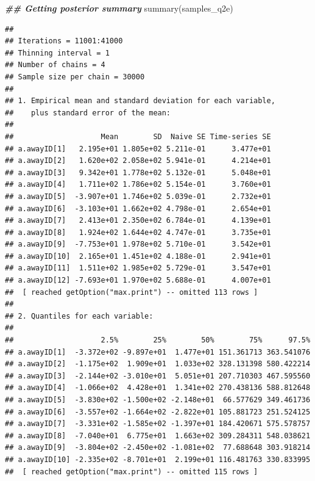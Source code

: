 \documentclass[
]{article}
\newenvironment{Shaded}{\begin{snugshade}}{\end{snugshade}}
\newcommand{\DocumentationTok}[1]{\textcolor[rgb]{0.56,0.35,0.01}{\textbf{\textit{#1}}}}
\newcommand{\FunctionTok}[1]{\textcolor[rgb]{0.00,0.00,0.00}{#1}}
\newcommand{\NormalTok}[1]{#1}
\begin{document}
\begin{Shaded}
\begin{Highlighting}[]
\DocumentationTok{\#\# Getting posterior summary}
\FunctionTok{summary}\NormalTok{(samples\_q2e)}
\end{Highlighting}
\end{Shaded}

\begin{verbatim}
## 
## Iterations = 11001:41000
## Thinning interval = 1 
## Number of chains = 4 
## Sample size per chain = 30000 
## 
## 1. Empirical mean and standard deviation for each variable,
##    plus standard error of the mean:
## 
##                    Mean        SD  Naive SE Time-series SE
## a.awayID[1]   2.195e+01 1.805e+02 5.211e-01      3.477e+01
## a.awayID[2]   1.620e+02 2.058e+02 5.941e-01      4.214e+01
## a.awayID[3]   9.342e+01 1.778e+02 5.132e-01      5.048e+01
## a.awayID[4]   1.711e+02 1.786e+02 5.154e-01      3.760e+01
## a.awayID[5]  -3.907e+01 1.746e+02 5.039e-01      2.732e+01
## a.awayID[6]  -3.103e+01 1.662e+02 4.798e-01      2.654e+01
## a.awayID[7]   2.413e+01 2.350e+02 6.784e-01      4.139e+01
## a.awayID[8]   1.924e+02 1.644e+02 4.747e-01      3.735e+01
## a.awayID[9]  -7.753e+01 1.978e+02 5.710e-01      3.542e+01
## a.awayID[10]  2.165e+01 1.451e+02 4.188e-01      2.941e+01
## a.awayID[11]  1.511e+02 1.985e+02 5.729e-01      3.547e+01
## a.awayID[12] -7.693e+01 1.970e+02 5.688e-01      4.007e+01
##  [ reached getOption("max.print") -- omitted 113 rows ]
## 
## 2. Quantiles for each variable:
## 
##                    2.5%        25%        50%        75%      97.5%
## a.awayID[1]  -3.372e+02 -9.897e+01  1.477e+01 151.361713 363.541076
## a.awayID[2]  -1.175e+02  1.909e+01  1.033e+02 328.131398 580.422214
## a.awayID[3]  -2.144e+02 -3.010e+01  5.051e+01 207.710303 467.595560
## a.awayID[4]  -1.066e+02  4.428e+01  1.341e+02 270.438136 588.812648
## a.awayID[5]  -3.830e+02 -1.500e+02 -2.148e+01  66.577629 349.461736
## a.awayID[6]  -3.557e+02 -1.664e+02 -2.822e+01 105.881723 251.524125
## a.awayID[7]  -3.331e+02 -1.585e+02 -1.397e+01 184.420671 575.578757
## a.awayID[8]  -7.040e+01  6.775e+01  1.663e+02 309.284311 548.038621
## a.awayID[9]  -3.804e+02 -2.450e+02 -1.081e+02  77.688648 303.918214
## a.awayID[10] -2.335e+02 -8.701e+01  2.199e+01 116.481763 330.833995
##  [ reached getOption("max.print") -- omitted 115 rows ]
\end{verbatim}
\end{document}
